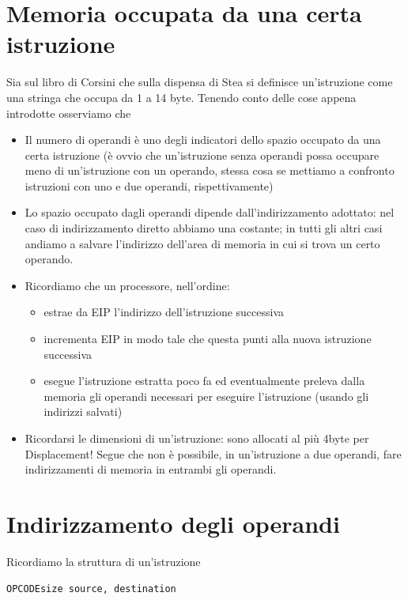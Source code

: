 \documentclass[11pt]{report}
\begin{document}
\section{Memoria occupata da una certa istruzione}
Sia sul libro di Corsini che sulla dispensa di Stea si definisce un'istruzione come una stringa che occupa da 1 a 14 byte. Tenendo conto delle cose appena introdotte osserviamo che
\begin{itemize}
\item Il numero di operandi è uno degli indicatori dello spazio occupato da una certa istruzione (è ovvio che un'istruzione senza operandi possa occupare meno di un'istruzione con un operando, stessa cosa se mettiamo a confronto istruzioni con uno e due operandi, rispettivamente)
\item Lo spazio occupato dagli operandi dipende dall'indirizzamento adottato: nel caso di indirizzamento diretto abbiamo una costante; in tutti gli altri casi andiamo a salvare l'indirizzo dell'area di memoria in cui si trova un certo operando.
\item Ricordiamo che un processore, nell'ordine:
\begin{itemize}
\item estrae da EIP l'indirizzo dell'istruzione successiva
\item incrementa EIP in modo tale che questa punti alla nuova istruzione successiva
\item esegue l'istruzione estratta poco fa ed eventualmente preleva dalla memoria gli operandi necessari per eseguire l'istruzione (usando gli indirizzi salvati)
\end{itemize}
\item Ricordarsi le dimensioni di un'istruzione: sono allocati al più 4byte per Displacement! Segue che non è possibile, in un'istruzione a due operandi, fare indirizzamenti di memoria in entrambi gli operandi.
\end{itemize}
\section{Indirizzamento degli operandi}
Ricordiamo la struttura di un'istruzione
\begin{verbatim}
OPCODEsize source, destination
\end{verbatim}
\end{document}
